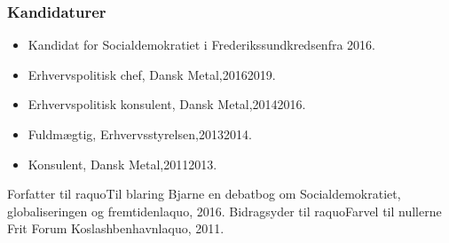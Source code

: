 \documentclass[11pt, a4paper]{awesome-cv}
\begin{document}
\begin{cvletter}
\subsubsection*{Kandidaturer}
\begin{itemize}
\item Kandidat for Socialdemokratiet i Frederikssundkredsenfra 2016.
\end{itemize}
\begin{itemize}
\item Erhvervspolitisk chef, Dansk Metal,20162019.
\item Erhvervspolitisk konsulent, Dansk Metal,20142016.
\item Fuldmægtig, Erhvervsstyrelsen,20132014.
\item Konsulent, Dansk Metal,20112013.
\end{itemize}
Forfatter til raquoTil blaring Bjarne  en debatbog om Socialdemokratiet, globaliseringen og fremtidenlaquo, 2016. Bidragsyder til raquoFarvel til nullerne  Frit Forum Koslashbenhavnlaquo, 2011.

\end{cvletter}
\end{document}
